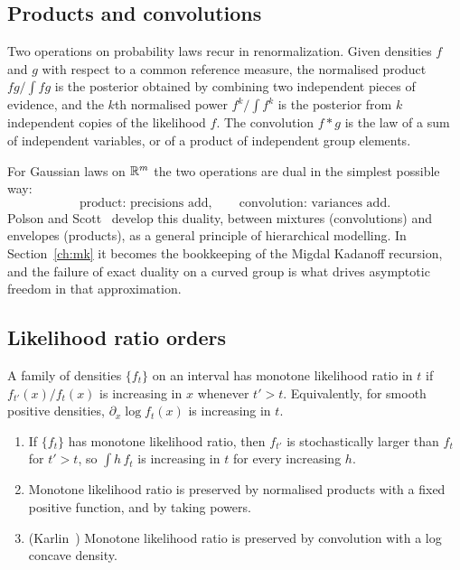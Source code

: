 \subsection{Products and convolutions}\label{sec:prodconv}

Two operations on probability laws recur in renormalization. Given densities $f$ and $g$ with respect to a common reference measure, the normalised product $fg/\int fg$ is the posterior obtained by combining two independent pieces of evidence, and the $k$th normalised power $f^k/\int f^k$ is the posterior from $k$ independent copies of the likelihood $f$. The convolution $f*g$ is the law of a sum of independent variables, or of a product of independent group elements.

For Gaussian laws on $\mathbb{R}^m$ the two operations are dual in the simplest possible way:
\[
\text{product: precisions add},\qquad\text{convolution: variances add}.
\]
Polson and Scott~\cite{PSdual} develop this duality, between mixtures (convolutions) and envelopes (products), as a general principle of hierarchical modelling. In Section~\ref{ch:mk} it becomes the bookkeeping of the Migdal Kadanoff recursion, and the failure of exact duality on a curved group is what drives asymptotic freedom in that approximation.

\subsection{Likelihood ratio orders}\label{sec:lro}

\begin{definition}
A family of densities $\{f_t\}$ on an interval has monotone likelihood ratio in $t$ if $f_{t'}(x)/f_t(x)$ is increasing in $x$ whenever $t'>t$. Equivalently, for smooth positive densities, $\partial_x\log f_t(x)$ is increasing in $t$.
\end{definition}

\begin{proposition}\label{prop:lro}
\begin{enumerate}
\item[(i)] If $\{f_t\}$ has monotone likelihood ratio, then $f_{t'}$ is stochastically larger than $f_t$ for $t'>t$, so $\int h\,f_t$ is increasing in $t$ for every increasing $h$.
\item[(ii)] Monotone likelihood ratio is preserved by normalised products with a fixed positive function, and by taking powers.
\item[(iii)] (Karlin~\cite{Ka68}) Monotone likelihood ratio is preserved by convolution with a log concave density.
\end{enumerate}
\end{proposition}

